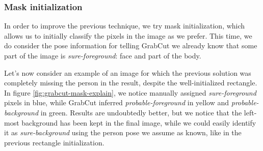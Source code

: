 \subsubsection{Mask initialization}
\label{subsec:masking-grabcut-mask}

In order to improve the previous technique, we try mask initialization, which allows us to initially classify the pixels in the image as we prefer. This time, we do consider the pose information for telling GrabCut we already know that some part of the image is \textit{sure-foreground}: face and part of the body.

Let's now consider an example of an image for which the previous solution was completely missing the person in the result, despite the well-initialized rectangle.
In figure \ref{fig:grabcut-mask-explain}, we notice manually assigned \textit{sure-foreground} pixels in blue, while GrabCut inferred \textit{probable-foreground} in yellow and \textit{probable-background} in green. Results are undoubtedly better, but we notice that the left-most background has been kept in the final image, while we could easily identify it as \textit{sure-background} using the person pose we assume as known, like in the previous rectangle initialization.

